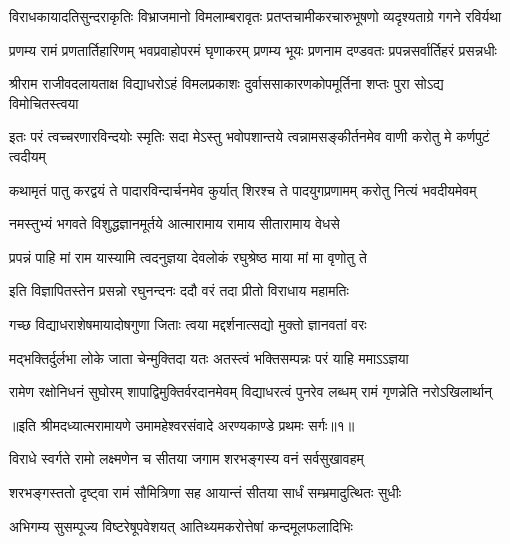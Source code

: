 \fourlineindentedshloka
{विराधकायादतिसुन्दराकृतिः}
{विभ्राजमानो विमलाम्बरावृतः}
{प्रतप्तचामीकरचारुभूषणो}
{व्यदृश्यताग्रे गगने रविर्यथा} %

\fourlineindentedshloka
{प्रणम्य रामं प्रणतार्तिहारिणम्}
{भवप्रवाहोपरमं घृणाकरम्}
{प्रणम्य भूयः प्रणनाम दण्डवतः}
{प्रपन्नसर्वार्तिहरं प्रसन्नधीः} %


\fourlineindentedshloka
{श्रीराम राजीवदलायताक्ष}
{विद्याधरोऽहं विमलप्रकाशः}
{दुर्वाससाकारणकोपमूर्तिना}
{शप्तः पुरा सोऽद्य विमोचितस्त्वया} %

\fourlineindentedshloka
{इतः परं त्वच्चरणारविन्दयोः}
{स्मृतिः सदा मेऽस्तु भवोपशान्तये}
{त्वन्नामसङ्कीर्तनमेव वाणी}
{करोतु मे कर्णपुटं त्वदीयम्} %

\fourlineindentedshloka
{कथामृतं पातु करद्वयं ते}
{पादारविन्दार्चनमेव कुर्यात्}
{शिरश्च ते पादयुगप्रणामम्}
{करोतु नित्यं भवदीयमेवम्} %

\twolineshloka
{नमस्तुभ्यं भगवते विशुद्धज्ञानमूर्तये}
{आत्मारामाय रामाय सीतारामाय वेधसे} %

\twolineshloka
{प्रपन्नं पाहि मां राम यास्यामि त्वदनुज्ञया}
{देवलोकं रघुश्रेष्ठ माया मां मा वृणोतु ते} %

\twolineshloka
{इति विज्ञापितस्तेन प्रसन्नो रघुनन्दनः}
{ददौ वरं तदा प्रीतो विराधाय महामतिः} %

\twolineshloka
{गच्छ विद्याधराशेषमायादोषगुणा जिताः}
{त्वया मद्दर्शनात्सद्यो मुक्तो ज्ञानवतां वरः} %

\twolineshloka
{मद्भक्तिर्दुर्लभा लोके जाता चेन्मुक्तिदा यतः}
{अतस्त्वं भक्तिसम्पन्नः परं याहि ममाऽऽज्ञया} %

\fourlineindentedshloka
{रामेण रक्षोनिधनं सुघोरम्}
{शापाद्विमुक्तिर्वरदानमेवम्}
{विद्याधरत्वं पुनरेव लब्धम्}
{रामं गृणन्नेति नरोऽखिलार्थान्} %

{॥इति श्रीमदध्यात्मरामायणे उमामहेश्वरसंवादे
अरण्यकाण्डे प्रथमः सर्गः॥१॥}





\twolineshloka
{विराधे स्वर्गते रामो लक्ष्मणेन च सीतया}
{जगाम शरभङ्गस्य वनं सर्वसुखावहम्} %

\twolineshloka
{शरभङ्गस्ततो दृष्ट्वा रामं सौमित्रिणा सह}
{आयान्तं सीतया सार्धं सम्भ्रमादुत्थितः सुधीः} %

\twolineshloka
{अभिगम्य सुसम्पूज्य विष्टरेषूपवेशयत्}
{आतिथ्यमकरोत्तेषां कन्दमूलफलादिभिः} %

